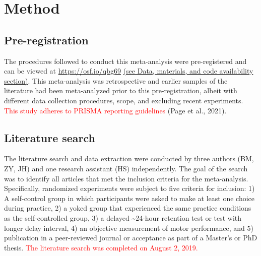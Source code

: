 \documentclass[
  english,
  man,floatsintext]{apa7}
\begin{document}
\hypertarget{method}{%
\section{Method}\label{method}}

\hypertarget{pre-registration}{%
\subsection{Pre-registration}\label{pre-registration}}

The procedures followed to conduct this meta-analysis were pre-registered and can be viewed at \url{https://osf.io/qbg69} \hyperref[sec:sharing]{(see Data, materials, and code availability section)}. This meta-analysis was retrospective and earlier samples of the literature had been meta-analyzed prior to this pre-registration, albeit with different data collection procedures, scope, and excluding recent experiments. \textcolor{red}{This study adheres to PRISMA reporting guidelines} (Page et al., 2021).

\hypertarget{literature-search}{%
\subsection{Literature search}\label{literature-search}}

The literature search and data extraction were conducted by three authors (BM, ZY, JH) and one research assistant (HS) independently. The goal of the search was to identify all articles that met the inclusion criteria for the meta-analysis. Specifically, randomized experiments were subject to five criteria for inclusion: 1) A self-control group in which participants were asked to make at least one choice during practice, 2) a yoked group that experienced the same practice conditions as the self-controlled group, 3) a delayed \textasciitilde24-hour retention test or test with longer delay interval, 4) an objective measurement of motor performance, and 5) publication in a peer-reviewed journal or acceptance as part of a Master's or PhD thesis. \textcolor{red}{The literature search was completed on August 2, 2019.}
\end{document}
